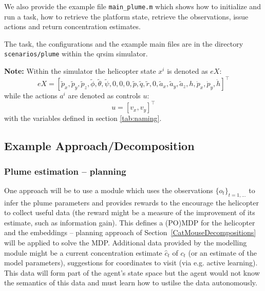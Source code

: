 \documentclass{article}
\newcommand\mytexttt[1]{\texttt{\hyphenchar\font=45\relax #1}}
\begin{document}
We also provide the example file \texttt{main\_plume.m} which shows how to initialize and run a task, how to retrieve the platform state, retrieve the observations, issue actions and return concentration estimates.

The task, the configurations and the example main files are in the directory \mytexttt{scenarios/plume} within the qrsim simulator. 

\textbf{Note:}
Within the simulator the helicopter state $x^i$ is denoted as $eX$:
$$eX = [\tilde{p}_x,\tilde{p}_y,\tilde{p}_z,\tilde{\phi},\tilde{\theta},\tilde{\psi},0,0,0,\tilde{p},\tilde{q},\tilde{r},0,\tilde{a}_x,\tilde{a}_y,\tilde{a}_z,h,\dot{p}_x,\dot{p}_y,\dot{h}]^\intercal$$
while the actions $a^i$ are denoted as controls $u$:
$$u=[v_x,v_y]^\intercal$$
with the variables defined in section \ref{tab:naming}.


\subsection{Example Approach/Decomposition}

\subsubsection{Plume estimation -- planning}

One approach will be to use a module which uses the observations $\{o_t\}_{t=1,...}$ to infer the plume parameters and provides rewards to the encourage the helicopter to collect useful data (the reward might be a measure of the improvement of its estimate, such as information gain). This defines a (PO)MDP for the helicopter and the embeddings -- planning approach of Section~\ref{CatMouseDecompositions} will be applied to solve the MDP. Additional data provided by the modelling module might be a current concentration estimate $\hat c_t$ of $c_t$ (or an estimate of the model parameters), suggestions for coordinates to visit (via e.g. active learning). This data will form part of the agent's state space but  the agent would not know the semantics of this data and must learn how to ustilse the data autonomously.


\iffalse
\section*{Acknowledgments}
The authors want to thank for the support of the EPSRC \#EP/H017402/1 (CARDyAL) and the European Union \#FP7-ICT-270327 (CompLACS).
\fi
\end{document}
